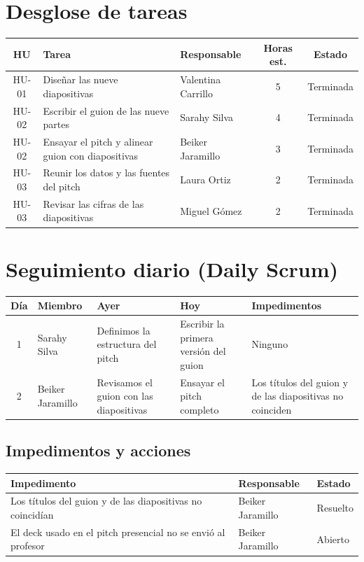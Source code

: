 \documentclass[11pt,a4paper]{article}
\begin{document}
\section{Desglose de tareas}

\begin{tabularx}{\textwidth}{c X l c c}
  \toprule
  \textbf{HU} & \textbf{Tarea} & \textbf{Responsable} & \textbf{Horas est.} & \textbf{Estado} \\
  \midrule
  HU-01 & Diseñar las nueve diapositivas & Valentina Carrillo & 5 & Terminada \\
  HU-02 & Escribir el guion de las nueve partes & Sarahy Silva & 4 & Terminada \\
  HU-02 & Ensayar el pitch y alinear guion con diapositivas & Beiker Jaramillo & 3 & Terminada \\
  HU-03 & Reunir los datos y las fuentes del pitch & Laura Ortiz & 2 & Terminada \\
  HU-03 & Revisar las cifras de las diapositivas & Miguel Gómez & 2 & Terminada \\
  \bottomrule
\end{tabularx}

\section{Seguimiento diario (Daily Scrum)}

\begin{tabularx}{\textwidth}{c l X X X}
  \toprule
  \textbf{Día} & \textbf{Miembro} & \textbf{Ayer} & \textbf{Hoy} & \textbf{Impedimentos} \\
  \midrule
  1 & Sarahy Silva & Definimos la estructura del pitch & Escribir la primera versión del guion & Ninguno \\
  2 & Beiker Jaramillo & Revisamos el guion con las diapositivas & Ensayar el pitch completo & Los títulos del guion y de las diapositivas no coinciden \\
  \bottomrule
\end{tabularx}

\subsection{Impedimentos y acciones}

\begin{tabularx}{\textwidth}{X l l}
  \toprule
  \textbf{Impedimento} & \textbf{Responsable} & \textbf{Estado} \\
  \midrule
  Los títulos del guion y de las diapositivas no coincidían & Beiker Jaramillo & Resuelto \\
  El deck usado en el pitch presencial no se envió al profesor & Beiker Jaramillo & Abierto \\
  \bottomrule
\end{tabularx}
\end{document}
